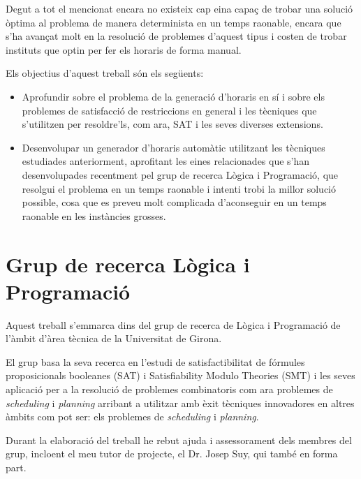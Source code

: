 \documentclass[11pt,a4paper,twoside]{report}
\begin{document}
  Degut a tot el mencionat encara no existeix cap eina capaç de trobar una solució òptima al problema de manera determinista en un temps raonable, encara que s'ha avançat molt en la resolució de problemes d'aquest tipus i costen de trobar instituts que optin per fer els horaris de forma manual.
  
  Els objectius d'aquest treball són els següents:
  \begin{itemize}
    \item Aprofundir sobre el problema de la generació d'horaris en sí i sobre els problemes de satisfacció de restriccions en general i les tècniques que s'utilitzen per resoldre'ls, com ara, SAT i les seves diverses extensions.
    \item Desenvolupar un generador d'horaris automàtic utilitzant les tècniques estudiades anteriorment, aprofitant les eines relacionades que s'han desenvolupades recentment pel grup de recerca Lògica i Programació, que resolgui el problema en un temps raonable i intenti trobi la millor solució possible, 
    cosa que es preveu molt complicada d'aconseguir en un temps raonable en les instàncies grosses.
    
  \end{itemize}
  
  \section{Grup de recerca Lògica i Programació}
  Aquest treball s'emmarca dins del grup de recerca de Lògica i Programació de l'àmbit d'àrea tècnica de la Universitat de Girona.

  El grup basa la seva recerca en l'estudi de satisfactibilitat de fórmules proposicionals booleanes (SAT) i Satisfiability Modulo Theories (SMT) i les seves
  aplicació per a la resolució de problemes combinatoris com ara problemes de \textit{scheduling} i \textit{planning} arribant a utilitzar amb èxit tècniques innovadores en altres àmbits com
  pot ser: els problemes de \textit{scheduling} i \textit{planning}.

  Durant la elaboració del treball he rebut ajuda i assessorament dels membres del grup, incloent el meu tutor de projecte, el Dr. Josep Suy, qui també en forma part.
\end{document}
